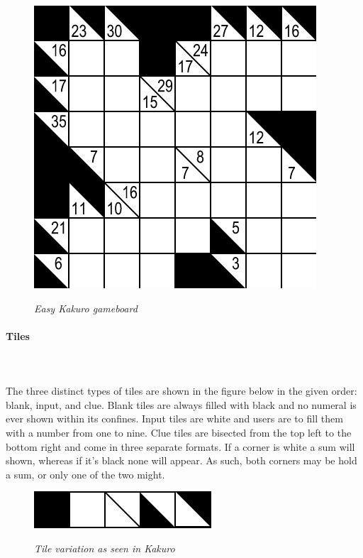 \documentclass[12pt]{article}
\begin{document}
\begin{figure}[htbp]
\centerline{\includegraphics[scale=.6]{gameboard.png}}
\centerline{\textit {Easy Kakuro gameboard}}
\end{figure}

\paragraph{Tiles}\hfill\\ 
\hfill\\ 
The three distinct types of tiles are shown in the figure below in the given order: blank, input, and clue. Blank tiles are always filled with black and no numeral is ever shown within its confines. Input tiles are white and users are to fill them with a number from one to nine. Clue tiles are bisected from the top left to the bottom right and come in three separate formats. If a corner is white a sum will shown, whereas if it's black none will appear. As such, both corners may be hold a sum, or only one of the two might. \\ 

\begin{figure}[htbp]
\centerline{\includegraphics[scale=.75]{tilevariation.png}}
\centerline{\textit {Tile variation as seen in Kakuro}}
\end{figure}

\newpage
\pagestyle{plain} 
\end{document}
